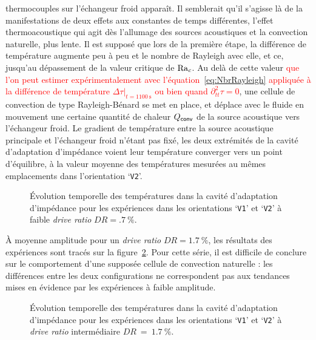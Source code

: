 thermocouples sur l'échangeur froid apparaît. Il semblerait qu'il s'agisse là de la manifestations de deux effets aux constantes de temps différentes, l'effet thermoacoustique qui agit dès l'allumage des sources acoustiques et la convection naturelle, plus lente. Il est supposé que lors de la première étape, la différence de température augmente peu à peu et le nombre de Rayleigh avec elle, et ce, jusqu'au dépassement de la valeur critique de $\mathrm{Ra}_c$. Au delà de cette valeur \textcolor{red}{que l'on peut estimer expérimentalement avec l'équation~\eqref{eq:NbrRayleigh} appliquée à la différence de température $\Delta \tau|_{t=\qty{1100}{\second}}$ ou bien quand $\partial^2_{tt}\tau=\num{0}$}, une cellule de convection de type Rayleigh-Bénard se met en place, et déplace avec le fluide en mouvement une certaine quantité de chaleur $Q_{\sf conv}$ de la source acoustique vers l'échangeur froid. Le gradient de température entre la source acoustique principale et l'échangeur froid n'étant pas fixé, les deux extrémités de la cavité d'adaptation d'impédance voient leur température converger vers un point d'équilibre, à la valeur moyenne des températures mesurées au mêmes emplacements dans l'orientation `\texttt{V2}'.
\smallskip
 
\begin{figure}[!ht]
    \centering
    
    \caption{\'Evolution temporelle des températures dans la cavité d'adaptation d'impédance pour les expériences dans les orientations `\texttt{V1}' et `\texttt{V2}' à faible \textit{drive ratio} $DR=\qty{.7}{\percent}$.}
    \label{fig:Acou_CHXout_V1V2_Low}
\end{figure}

À moyenne amplitude pour un \textit{drive ratio} $DR=\qty{1.7}{\percent}$, les résultats des expériences sont tracés sur la figure~\ref{fig:Acou_CHXout_V1V2_Mid}. Pour cette série, il est difficile de conclure sur le comportement d'une supposée cellule de convection naturelle : les différences entre les deux configurations ne correspondent pas aux tendances mises en évidence par les expériences à faible amplitude.
\smallskip

\begin{figure}[!ht]
    \centering
    
    \caption{\'Evolution temporelle des températures dans la cavité d'adaptation d'impédance pour les expériences dans les orientations `\texttt{V1}' et `\texttt{V2}' à \textit{drive ratio} intermédiaire $DR~=~\qty{1.7}{\percent}$.}
    \label{fig:Acou_CHXout_V1V2_Mid}
\end{figure}

